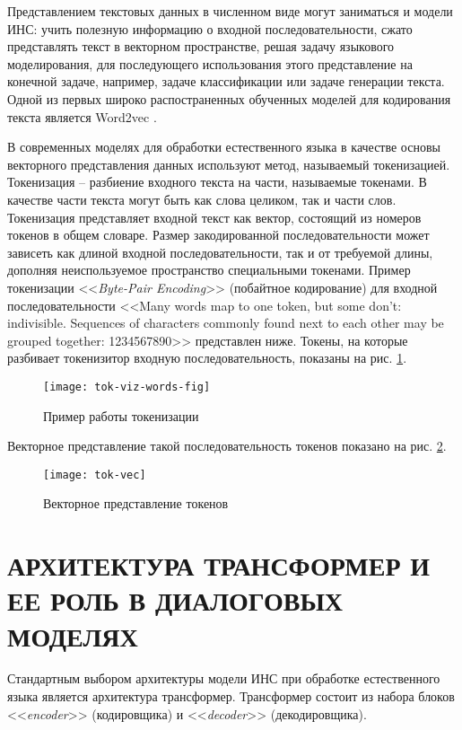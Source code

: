 Представлением текстовых данных в численном виде могут заниматься и модели ИНС: учить полезную информацию о входной последовательности, сжато представлять текст в векторном пространстве, решая задачу языкового моделирования, для последующего использования этого представление на конечной задаче, например, задаче классификации или задаче генерации текста. Одной из первых широко распостраненных обученных моделей для кодирования текста является Word2vec \cite{word2vec-paper}.

В современных моделях для обработки естественного языка в качестве основы векторного представления данных используют метод, называемый токенизацией. Токенизация -- разбиение входного текста на части, называемые токенами. В качестве части текста могут быть как слова целиком, так и части слов. Токенизация представляет входной текст как вектор, состоящий из номеров токенов в общем словаре. Размер закодированной последовательности может зависеть как длиной входной последовательности, так и от требуемой длины, дополняя неиспользуемое пространство специальными токенами. Пример токенизации <<\textit{Byte-Pair Encoding}>> (побайтное кодирование) \cite{bpe-paper} для входной последовательности <<Many words map to one token, but some don't: indivisible. Sequences of characters commonly found next to each other may be grouped together: 1234567890>> представлен ниже. Токены, на которые разбивает токенизитор входную последовательность, показаны на рис. \ref{fig:tok-viz-words-fig}.
\begin{figure}[H]
    \centering
    \texttt{[image: tok-viz-words-fig]}
    \caption{Пример работы токенизации}
    \label{fig:tok-viz-words-fig}
\end{figure}

Векторное представление такой последовательность токенов показано на рис. \ref{fig:tok-vec}.
\begin{figure}[H]
    \centering
    \texttt{[image: tok-vec]}
    \caption{Векторное представление токенов}
    \label{fig:tok-vec}
\end{figure}

\section{АРХИТЕКТУРА ТРАНСФОРМЕР И ЕЕ РОЛЬ В ДИАЛОГОВЫХ МОДЕЛЯХ}
Стандартным выбором архитектуры модели ИНС при обработке естественного языка является архитектура трансформер. Трансформер состоит из набора блоков <<\textit{encoder}>> (кодировщика) и <<\textit{decoder}>> (декодировщика).

